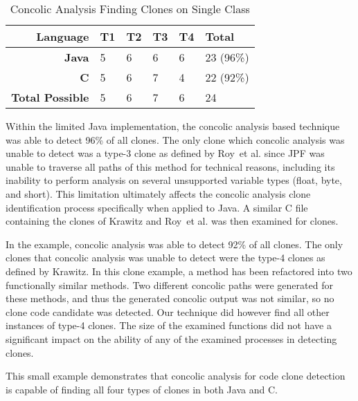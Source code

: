 \documentclass{sig-alternate}
\begin{document}
\begin{table}[thb!]
\begin{center}
\caption{Concolic Analysis Finding Clones on Single Class}
\label{table:singleclasscomparisionexample}
\begin{tabular}{r||l|l|l|l|l}
\bfseries Language & \bfseries T1 & \bfseries T2 & \bfseries T3 & \bfseries  T4 & \bfseries  Total \\ \hline\hline
 \bfseries  Java  & 5 & 6 & 6 & 6  & 23 (96\%)\\
  \hline
\bfseries  C  & 5 & 6 & 7 & 4  & 22 (92\%)\\

  \hline
\bfseries Total Possible & 5 & 6 & 7 & 6 & 24 \\ %

\end{tabular}

\end{center}
\end{table}


Within the limited Java implementation, the concolic analysis based technique was able to detect 96\% of all clones. The only clone which concolic analysis was unable to detect was a type-3 clone as defined by Roy~et al. since JPF was unable to traverse all paths of this method for technical reasons, including its inability to perform analysis on several unsupported variable types (float, byte, and short). This limitation ultimately affects the concolic analysis clone identification process specifically when applied to Java. A similar C file containing the clones of Krawitz and Roy~et al. was then examined for clones. 

In the example, concolic analysis was able to detect 92\% of all clones. The only clones that concolic analysis was unable to detect were the type-4 clones as defined by Krawitz. In this clone example, a method has been refactored into two functionally similar methods. Two different concolic paths were generated for these methods, and thus the generated concolic output was not similar, so no clone code candidate was detected. Our technique did however find all other instances of type-4 clones. The size of the examined functions did not have a significant impact on the ability of any of the examined processes in detecting clones.

This small example demonstrates that concolic analysis for code clone detection is capable of finding all four types of clones in both Java and C. \\
\end{document}
